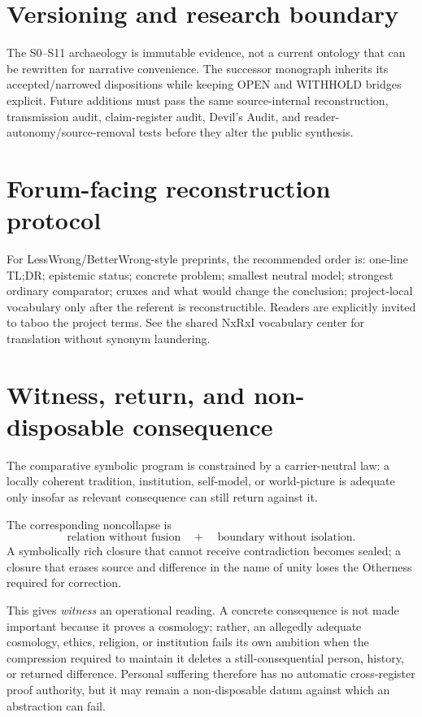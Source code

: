 \documentclass[11pt]{article}
\begin{document}
\section{Versioning and research boundary}
The S0--S11 archaeology is immutable evidence, not a current ontology that can be
rewritten for narrative convenience.  The successor monograph inherits its
accepted/narrowed dispositions while keeping OPEN and WITHHOLD bridges explicit.
Future additions must pass the same source-internal reconstruction, transmission
audit, claim-register audit, Devil's Audit, and reader-autonomy/source-removal
tests before they alter the public synthesis.

\section{Forum-facing reconstruction protocol}
For LessWrong/BetterWrong-style preprints, the recommended order is: one-line
TL;DR; epistemic status; concrete problem; smallest neutral model; strongest
ordinary comparator; cruxes and what would change the conclusion; project-local
vocabulary only after the referent is reconstructible.  Readers are explicitly
invited to taboo the project terms.  See the shared NxRxI vocabulary center for
translation without synonym laundering.

\printbibliography

\section{Witness, return, and non-disposable consequence}

The comparative symbolic program is constrained by a carrier-neutral law:
a locally coherent tradition, institution, self-model, or world-picture is
adequate only insofar as relevant consequence can still return against it.

The corresponding noncollapse is
\[
\boxed{
\text{relation without fusion}
\quad+\quad
\text{boundary without isolation}.
}
\]
A symbolically rich closure that cannot receive contradiction becomes sealed;
a closure that erases source and difference in the name of unity loses the
Otherness required for correction.

This gives \emph{witness} an operational reading.  A concrete consequence is
not made important because it proves a cosmology; rather, an allegedly adequate
cosmology, ethics, religion, or institution fails its own ambition when the
compression required to maintain it deletes a still-consequential person,
history, or returned difference.  Personal suffering therefore has no automatic
cross-register proof authority, but it may remain a non-disposable datum against
which an abstraction can fail.
\end{document}
